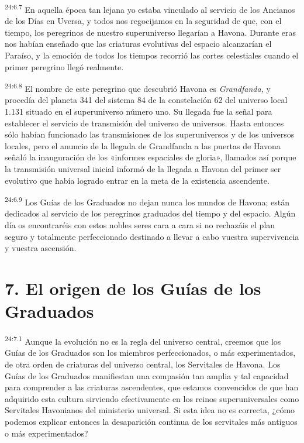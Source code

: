 \par
\textsuperscript{24:6.7} En aquella época tan lejana yo estaba vinculado al servicio de los Ancianos de los Días en Uversa, y todos nos regocijamos en la seguridad de que, con el tiempo, los peregrinos de nuestro superuniverso llegarían a Havona. Durante eras nos habían enseñado que las criaturas evolutivas del espacio alcanzarían el Paraíso, y la emoción de todos los tiempos recorrió las cortes celestiales cuando el primer peregrino llegó realmente.

\par
\textsuperscript{24:6.8} El nombre de este peregrino que descubrió Havona es \textit{Grandfanda,} y procedía del planeta 341 del sistema 84 de la constelación 62 del universo local 1.131 situado en el superuniverso número uno. Su llegada fue la señal para establecer el servicio de transmisión del universo de universos. Hasta entonces sólo habían funcionado las transmisiones de los superuniversos y de los universos locales, pero el anuncio de la llegada de Grandfanda a las puertas de Havona señaló la inauguración de los «informes espaciales de gloria», llamados así porque la transmisión universal inicial informó de la llegada a Havona del primer ser evolutivo que había logrado entrar en la meta de la existencia ascendente.

\par
\textsuperscript{24:6.9} Los Guías de los Graduados no dejan nunca los mundos de Havona; están dedicados al servicio de los peregrinos graduados del tiempo y del espacio. Algún día os encontraréis con estos nobles seres cara a cara si no rechazáis el plan seguro y totalmente perfeccionado destinado a llevar a cabo vuestra supervivencia y vuestra ascensión.

\section*{7. El origen de los Guías de los Graduados}
\par
\textsuperscript{24:7.1} Aunque la evolución no es la regla del universo central, creemos que los Guías de los Graduados son los miembros perfeccionados, o más experimentados, de otra orden de criaturas del universo central, los Servitales de Havona. Los Guías de los Graduados manifiestan una compasión tan amplia y tal capacidad para comprender a las criaturas ascendentes, que estamos convencidos de que han adquirido esta cultura sirviendo efectivamente en los reinos superuniversales como Servitales Havonianos del ministerio universal. Si esta idea no es correcta, ¿cómo podemos explicar entonces la desaparición continua de los servitales más antiguos o más experimentados?

